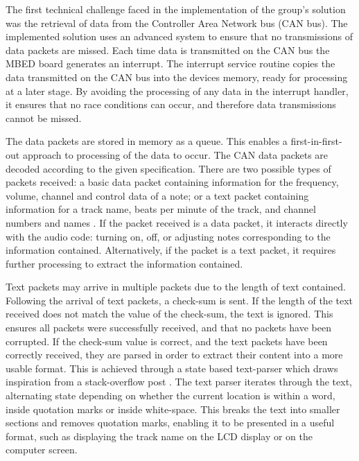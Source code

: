 The first technical challenge faced in the implementation of the group's solution
was the retrieval of data from the Controller Area Network bus (CAN bus). The 
implemented solution uses an advanced system to ensure that no transmissions of 
data packets are missed. 
Each time data is transmitted on the CAN bus the MBED board generates an interrupt. 
The interrupt service routine copies the data transmitted on the CAN bus into 
the devices memory, ready for processing at a later stage. 
By avoiding the processing of any data in the interrupt handler, it ensures 
that no race conditions can occur, and therefore data transmissions cannot be 
missed. 
\par\bigskip\noindent
The data packets are stored in memory as a queue. 
This enables a first-in-first-out approach to processing of the data to occur. 
The CAN data packets are decoded according to the given specification. 
There are two possible types of packets received: a basic data packet containing 
information for the frequency, volume, channel and control data of a note; or
a text packet containing information for a track name, beats per minute of the 
track, and channel numbers and names \cite{data-packet}.
If the packet received is a data packet, it interacts directly with the audio 
code: turning on, off, or adjusting notes corresponding to the information 
contained. 
Alternatively, if the packet is a text packet, it requires further processing to 
extract the information contained. 
\par\bigskip\noindent
Text packets may arrive in multiple packets due to the length of text contained. 
Following the arrival of text packets, a check-sum is sent. 
If the length of the text received does not match the value of the check-sum, 
the text is ignored. 
This ensures all packets were successfully received, and that no packets have 
been corrupted. 
If the check-sum value is correct, and the text packets have been correctly 
received, they are parsed in order to extract their content into a more usable 
format. 
This is achieved through a state based text-parser which draws inspiration from 
a stack-overflow post \cite{text-parser}. 
The text parser iterates through the text, alternating state depending on whether 
the current location is within a word, inside quotation marks or inside 
white-space. 
This breaks the text into smaller sections and removes quotation marks, 
enabling it to be presented in a useful format, such as displaying the track 
name on the LCD display or on the computer screen. 

